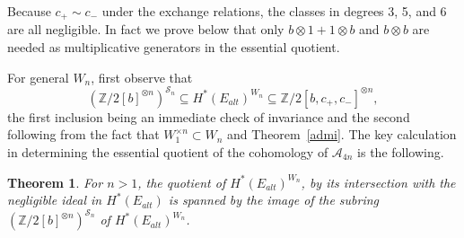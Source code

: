 \documentclass{article}
\theoremstyle{plain}
\newtheorem{theorem}{Theorem}
\theoremstyle{definition}
\newcommand{\Z}{\mathbb{Z}}
\newcommand{\si}{\mathcal{S}}
\newcommand{\alt}{\mathcal{A}}
\begin{document}
Because $c_+ \sim c_-$ under the exchange relations, the classes in degrees 3, 5, and 6 are all negligible.  In fact we prove below that only 
$b \otimes 1 + 1 \otimes b$ and $b \otimes b$ are needed as multiplicative
generators in the essential quotient.  

For general $W_n$, first observe that 
$$\left( \Z/2[b]^{\otimes n}\right)^{\si_n} \subseteq H^*(E_{alt})^{W_n} \subseteq \Z/2[b, c_+, c_-]^{\otimes n},$$
the first inclusion being an immediate check of invariance
and the second following from the fact that  $W_1^{\times n} \subset W_n$ and Theorem~\ref{admi}.  The key calculation 
in determining the essential quotient of the cohomology
of $\alt_{4n}$ is the following.




\begin{theorem}\label{Wninvts}
    For $n>1$, the quotient of $H^*(E_{alt})^{W_n}$, 
    by its intersection with the negligible ideal
in $H^*(E_{alt})$  is spanned
    by the image of the subring $\left( \Z/2[b]^{\otimes n}\right)^{\si_n}$ of $ H^*(E_{alt})^{W_n}$.
\end{theorem}
\end{document}
